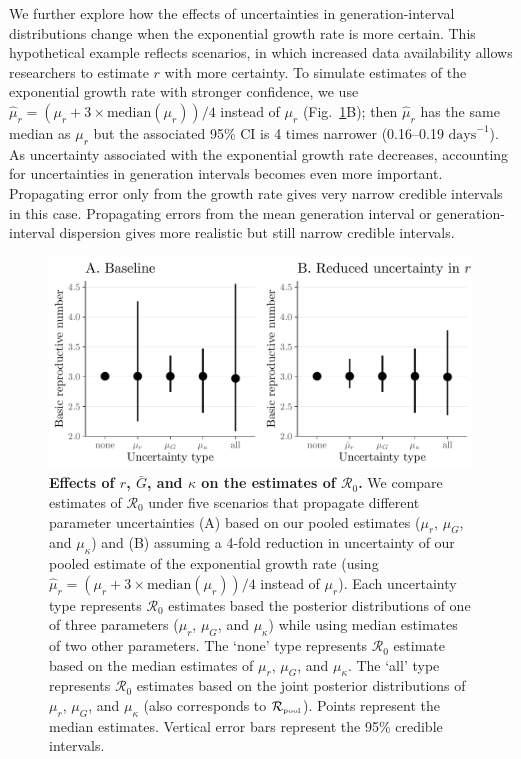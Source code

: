 \documentclass[12pt]{article}
\newcommand{\fref}[1]{Fig.~\ref{fig:#1}}
\newcommand{\Ro}{\ensuremath{{\mathcal R}_{0}}\xspace}
\newcommand{\Rpool}{\ensuremath{{\mathcal R}_{\textrm{\tiny{pool}}}}\xspace}
\begin{document}
We further explore how the effects of uncertainties in generation-interval distributions change when the exponential growth rate is more certain.
This hypothetical example reflects scenarios, in which increased data availability allows researchers to estimate $r$ with more certainty.
To simulate estimates of the exponential growth rate with stronger confidence, we use $\hat{\mu}_r = (\mu_r + 3\times\mathrm{median}(\mu_r))/4$ instead of $\mu_r$ (\fref{eff}B); 
then $\hat{\mu}_r$ has the same median as $\mu_r$ but the associated 95\% CI is 4 times narrower (0.16--0.19 $\textrm{days}^{-1}$).
As uncertainty associated with the exponential growth rate decreases, accounting for uncertainties in generation intervals becomes even more important.
Propagating error only from the growth rate gives very narrow credible intervals in this case. 
Propagating errors from the mean generation interval or generation-interval dispersion gives more realistic but still narrow credible intervals.

\begin{figure}[!ht]
\includegraphics[width=\textwidth]{figure2.pdf}
\caption{
  \textbf{Effects of $r$, $\bar G$, and $\kappa$ on the estimates of \Ro.}
We compare estimates of \Ro under five scenarios that propagate different parameter uncertainties (A) based on our pooled estimates ($\mu_r$, $\mu_G$, and $\mu_\kappa$) and (B) assuming a 4-fold reduction in uncertainty of our pooled estimate of the exponential growth rate (using $\hat{\mu}_r = (\mu_r + 3\times\mathrm{median}(\mu_r))/4$ instead of $\mu_r$).
Each uncertainty type represents \Ro estimates based the posterior distributions of one of three parameters ($\mu_r$, $\mu_G$, and $\mu_\kappa$) while using median estimates of two other parameters.
The `none' type represents \Ro estimate based on the median estimates of $\mu_r$, $\mu_G$, and $\mu_\kappa$.
The `all' type represents \Ro estimates based on the joint posterior distributions of  $\mu_r$, $\mu_G$, and $\mu_\kappa$ (also corresponds to \Rpool).
Points represent the median estimates.
Vertical error bars represent the 95\% credible intervals.
}
\label{fig:eff}
\end{figure}
\end{document}
